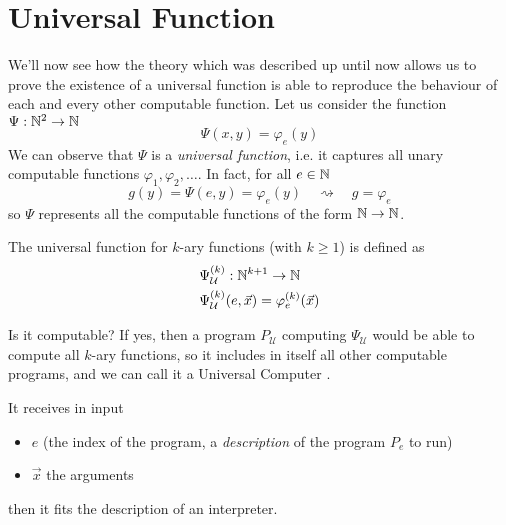 \chapter {Universal Function}
\newcommand{\Psiex}{\ensuremath{\Psi_{\mathcal{U}}^{(k)} (e, \vec{x})}}
\newcommand{\Psiuex}{\ensuremath{\Psi_e^{(k)} (\vec{x})}}
\newcommand{\univ}{\ensuremath{\Psi_{\mathcal{U}}}}
We'll now see how the theory which was described up until now allows us to
prove the existence of a
universal function is able to reproduce the behaviour of each
and every other computable function. 
Let us consider the function $\Psi : \mathbb{N}^{2} \rightarrow \mathbb{N}$
\[
  \Psi(x,y) = \varphi_e(y)
\]
We can observe that $\Psi$ is a \emph{universal function}, i.e. it
captures all unary computable functions $\varphi_1, \varphi_2, \dots$. In fact,
for all $e \in \mathbb{N}$
\[
  g(y) = \Psi(e,y) = \varphi_e(y) \quad \rightsquigarrow \quad g = \varphi_e
\]
so $\Psi$ represents all the computable functions of the
form $\mathbb{N} \to \mathbb{N}$.

\begin{definition}
  The universal function for $k$-ary functions (with $k \geq 1$) is
  defined as
  \begin{align*}
    &\univ^{(k)} : \nat^{k+1} \rightarrow \nat \\
    &\Psiex = \varphi_e^{(k)}(\vec{x})
  \end{align*}
\end{definition}
Is it computable? If yes, then a program $P_{\mathcal{U}}$ computing $\univ$ would
be able to compute all $k$-ary functions, so it includes in itself all
other computable programs, and we can call it a Universal Computer
\cite{davis:2011}.

It receives in
input
\begin{itemize}
\item $e$ (the index of the program, a \textit{description} of the
  program $P_e$ to run)
\item $\vec{x}$ the arguments
\end{itemize}
then it fits the description of an interpreter.

